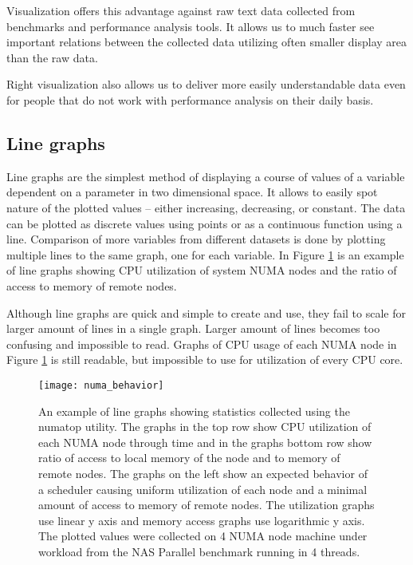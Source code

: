 Visualization offers this advantage against raw text data collected from
benchmarks and performance analysis tools. It allows us to much faster see
important relations between the collected data utilizing often smaller display area
than the raw data.

Right visualization also allows us to deliver more easily understandable data even
for people that do not work with performance analysis on their daily basis.

\subsection{Line graphs}
Line graphs are the simplest method of displaying a course of values of a variable
dependent on a parameter in two dimensional space. It allows to easily spot
nature of the plotted values -- either increasing, decreasing, or constant. The
data can be plotted as discrete values using points or as a continuous function
using a line. Comparison of more variables from different datasets is done by
plotting multiple lines to the same graph, one for each variable. In Figure
\ref{fig:linegraph} is an example of line graphs showing CPU utilization of system
NUMA nodes and the ratio of access to memory of remote nodes.

Although line graphs are quick and simple to create and use, they fail to scale
for larger amount of lines in a single graph. Larger amount of lines becomes too
confusing and impossible to read. Graphs of CPU usage of each NUMA node in
Figure \ref{fig:linegraph} is still readable, but impossible to use for
utilization of every CPU core.

\begin{figure}
  \centering
  \texttt{[image: numa\_behavior]}
  \caption{An example of line graphs showing statistics collected using the numatop
    utility. The graphs in the top row show CPU utilization of each NUMA node
    through time and in the graphs bottom row show ratio of access to local memory of
    the node and to memory of remote nodes. The graphs on the left show an expected
    behavior of a scheduler causing uniform utilization of each node and a minimal
    amount of access to memory of remote nodes. The utilization graphs use
    linear y axis and memory access graphs use logarithmic y axis. The plotted
    values were collected on 4 NUMA node machine under workload from the NAS
    Parallel benchmark running in 4 threads.}
  \label{fig:linegraph}
\end{figure}


